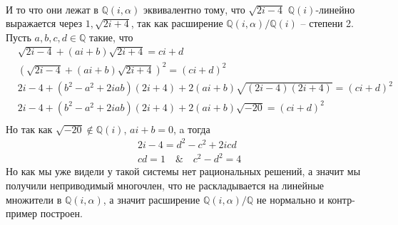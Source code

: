 \documentclass{article}
\begin{document}
\begin{enumerate}
\begin{align*}
        \end{align*}
        И то что они лежат в $\mathbb{Q}(i,\alpha)$ эквивалентно тому, что
        $\sqrt{2i-4}$ $\mathbb{Q}(i)$-линейно выражается через $1,\sqrt{2i+4}$,
        так как расширение $\mathbb{Q}(i,\alpha)/\mathbb{Q}(i)$ – степени 2.
        Пусть $a,b,c,d\in\mathbb{Q}$ такие, что
        \begin{align*}
            &\sqrt{2i-4}+(ai+b)\sqrt{2i+4}=ci+d\\
            &(\sqrt{2i-4}+(ai+b)\sqrt{2i+4})^2=(ci+d)^2\\
            &2i-4+(b^2-a^2+2iab)(2i+4)+2(ai+b)\sqrt{(2i-4)(2i+4)}=(ci+d)^2\\
            &2i-4+(b^2-a^2+2iab)(2i+4)+2(ai+b)\sqrt{-20}=(ci+d)^2\\
        \end{align*}
        Но так как $\sqrt{-20}\notin\mathbb{Q}(i)$, $ai+b=0$, a тогда
        \begin{align*}
            &2i-4=d^2-c^2+2icd\\
            &cd=1\quad\&\quad c^2-d^2=4
        \end{align*}
        Но как мы уже видели у такой системы нет рациональных решений, а значит
        мы получили неприводимый многочлен, что не раскладывается на линейные
        множители в $\mathbb{Q}(i,\alpha)$, а значит расширение $\mathbb{Q}(i,
        \alpha)/\mathbb{Q}$ не нормально и контр-пример построен.
        
\end{enumerate}
\end{document}
